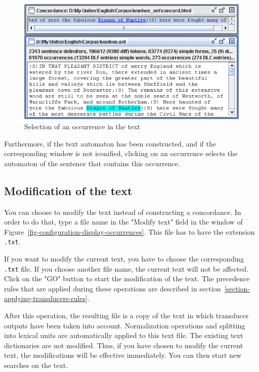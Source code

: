 \bigskip
\begin{figure}[h]
\begin{center}
\includegraphics[width=13.5cm]{resources/img/fig6-32.png}
\caption{Selection of an occurrence in the text\label{fig-back-to-text}}
\end{center}
\end{figure}

\noindent Furthermore, if the text automaton has been constructed, and if the
corresponding window is not iconified, clicking on an occurrence selects the automaton of the
sentence that contains this occurrence.

\subsection{Modification of the text}
\label{section-modifying-text}
You can choose to modify the text instead of constructing a concordance. In order
to do that, type a file name in the "Modify text" field in the window of
Figure~\ref{fig-configuration-display-occurrences}. This file has to have the
extension \verb+.txt+.

\bigskip
\noindent If you want to modify the current text, you have to choose the
corresponding \verb+.txt+ file. If you choose another file name, the current text will not be
affected. Click on the  "GO" button to start the modification of the text. The
precedence rules that are applied during these operations are described in
section~\ref{section-applying-transducers-rules}.

\bigskip
\noindent After this operation, the resulting file is a copy of the text
in which transducer outputs have been taken into account. Normalization
operations and splitting into lexical units are automatically applied to
this text file. The existing text dictionaries are not modified. Thus, if you
have chosen to modify the current text, the modifications will be effective
immediately. You can then start new searches on the text.

